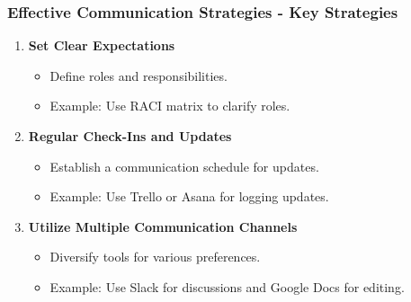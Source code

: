 \documentclass{beamer}
\begin{document}
\begin{frame}[fragile]
    \frametitle{Effective Communication Strategies - Key Strategies}
    \begin{enumerate}
        \item \textbf{Set Clear Expectations}
            \begin{itemize}
                \item Define roles and responsibilities.
                \item Example: Use RACI matrix to clarify roles.
            \end{itemize}

        \item \textbf{Regular Check-Ins and Updates}
            \begin{itemize}
                \item Establish a communication schedule for updates.
                \item Example: Use Trello or Asana for logging updates.
            \end{itemize}

        \item \textbf{Utilize Multiple Communication Channels}
            \begin{itemize}
                \item Diversify tools for various preferences.
                \item Example: Use Slack for discussions and Google Docs for editing.
            \end{itemize}
    \end{enumerate}
\end{frame}
\end{document}
